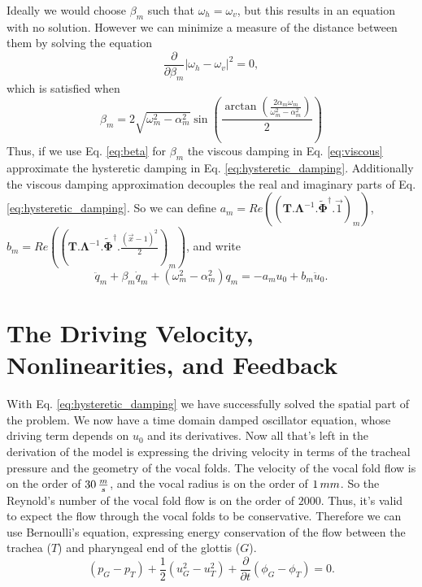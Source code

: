 \documentclass[superscriptaddress, onecolumn, prl]{revtex4}
\begin{document}
Ideally we would choose $\beta_m$ such that $\omega_h=\omega_v$, but this results in an equation with no solution. However we can minimize a measure of the distance between them by solving the equation
\begin{equation}
\label{eq:frequency_distance}
\frac{\partial}{\partial \beta_m} |\omega_h - \omega_v|^2 = 0,
\end{equation}
which is satisfied when
\begin{equation}
\label{eq:beta}
\beta_m = 2 \sqrt{\omega_m^2 - \alpha_m^2} \sin \left( \frac{\arctan \left( \frac{2 \alpha_m \omega_m}{\omega_m^2 - \alpha_m^2} \right)}{2} \right) 
\end{equation}
Thus, if we use Eq. \ref{eq:beta} for $\beta_m$ the viscous damping in Eq. \ref{eq:viscous} approximate the hysteretic damping in Eq. \ref{eq:hysteretic_damping}. Additionally the viscous damping approximation decouples the real and imaginary parts of Eq. \ref{eq:hysteretic_damping}. So we can define $a_m = Re((\boldsymbol{T}.\boldsymbol{\Lambda}^{-1}.\widetilde{\boldsymbol{\Phi}}^\dagger.\vec{1})_m)$, $b_m=Re((\boldsymbol{T}.\boldsymbol{\Lambda}^{-1}.\widetilde{\boldsymbol{\Phi}}^\dagger.\frac{(\vec{x}-1)^2}{2})_m)$, and write
\begin{equation}
\label{eq:viscous2}
\ddot{q}_m + \beta_m \dot{q}_m +(\omega_m^2 - \alpha_m^2) q_m = -a_m u_0 +b_m \ddot{u}_0.
\end{equation}  
\section{The Driving Velocity, Nonlinearities, and Feedback}
With Eq. \ref{eq:hysteretic_damping} we have successfully solved the spatial part of the problem. We now have a time domain damped oscillator equation, whose driving term depends on $u_0$ and its derivatives. Now all that's left in the derivation of the model is expressing the driving velocity in terms of the tracheal pressure and the geometry of the vocal folds. The velocity of the vocal fold flow is on the order of $30 \thinspace \frac{m}{s}$, and the vocal radius is on the order of $1 \thinspace mm$. So the Reynold's number of the vocal fold flow is on the order of $2000$. Thus, it's valid to expect the flow through the vocal folds to be conservative. Therefore we can use Bernoulli's equation, expressing energy conservation of the flow between the trachea ($T$) and pharyngeal end of the glottis ($G$).  
\begin{equation}
\label{eq:energy1}
(p_{G} - p_{T}) + \frac{1}{2}(u_{G}^2 - u_{T}^2) + \frac{\partial}{\partial t} (\phi_{G} - \phi_{T}) = 0.
\end{equation}  
\end{document}
